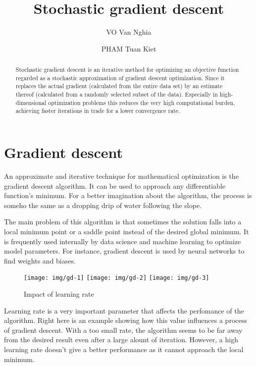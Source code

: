 \documentclass[
  a4paper]{article}
\title{Stochastic gradient descent}
\author{VO Van Nghia \and PHAM Tuan Kiet}
\date{}
\begin{document}
\maketitle
\begin{abstract}
Stochastic gradient descent is an iterative method for optimizing an objective function regarded as a stochastic approximation of gradient descent optimization. Since it replaces the actual gradient (calculated from the entire data set) by an estimate thereof (calculated from a randomly selected subset of the data). Especially in high-dimensional optimization problems this reduces the very high computational burden, achieving faster iterations in trade for a lower convergence rate.
\end{abstract}

\hypertarget{gradient-descent}{%
\section{Gradient descent}\label{gradient-descent}}

An approximate and iterative technique for mathematical optimization is the gradient descent algorithm. It can be used to approach any differentiable function's minimum. For a better imagination about the algorithm, the process is someho the same as a dropping drip of water following the slope.

The main problem of this algorithm is that sometimes the solution falls into a local minimum point or a saddle point instead of the desired global minimum. It is frequently used internally by data science and machine learning to optimize model parameters. For instance, gradient descent is used by neural networks to find weights and biases.

\begin{figure}
\texttt{[image: img/gd-1]} \texttt{[image: img/gd-2]} \texttt{[image: img/gd-3]} \caption{Impact of learning rate}\label{fig:unnamed-chunk-1}
\end{figure}

Learning rate is a very important parameter that affects the perfomance of the algorithm. Right here is an example showing how this value influences a process of gradient descent. With a too small rate, the algorithm seems to be far away from the desired result even after a large alount of iteration. However, a high learning rate doesn't give a better performance as it cannot approach the local minimum.
\end{document}
